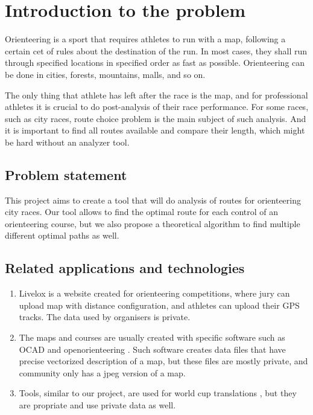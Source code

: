\documentclass[a4paper,12pt]{extarticle}
\begin{document}
\section{Introduction to the problem}

Orienteering \cite{orienteering} is a sport that requires athletes to run with a map, following a certain cet of rules about the destination of the run.
In most cases, they shall run through specified locations in specified order as fast as possible.
Orienteering can be done in cities, forests, mountains, malls, and so on.

The only thing that athlete has left after the race is the map, and for professional athletes it is crucial to do post-analysis of their race performance.
For some races, such as city races, route choice problem is the main subject of such analysis.
And it is important to find all routes available and compare their length, which might be hard without an analyzer tool.

\subsection{Problem statement}

This project aims to create a tool that will do analysis of routes for orienteering city races.
Our tool allows to find the optimal route for each control of an orienteering course, but we also propose a theoretical
algorithm to find multiple different optimal paths as well.

\subsection{Related applications and technologies}

\begin{enumerate}
    \item Livelox \cite{livelox} is a website created for orienteering competitions, where jury can upload map with distance configuration, and athletes can upload their GPS tracks.
The data used by organisers is private. 
    \item The maps and courses are usually created with specific software such as OCAD \cite{ocad} and openorienteering \cite{openorienteering}. 
Such software creates data files that have precise vectorized description of a map, but these files are mostly private, and community only has a jpeg version of a map.
    \item Tools, similar to our project, are used for world cup translations \cite{worldcup}, but they are propriate and use private data as well.
\end{enumerate}
\end{document}
